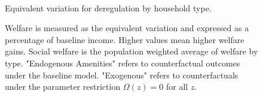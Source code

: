 \documentclass[12pt]{article}
\begin{document}
	
	\begin{figure}[htbp!]
		\begin{center}
		\caption{ \\ Equivalent variation for deregulation by household type. }\label{figure:welfare_ctfl}
		\end{center}
		\caption*{Welfare is measured as the equivalent variation and expressed as a percentage of baseline income. Higher values mean higher welfare gains. Social welfare is the population weighted average of welfare by type. "Endogenous Amenities" refers to counterfactual outcomes under the baseline model. "Exogenous" refers to counterfactuals under the parameter restriction $\Omega(z) = 0$ for all $z$.}
	\end{figure}
	
	
	
\end{document}
